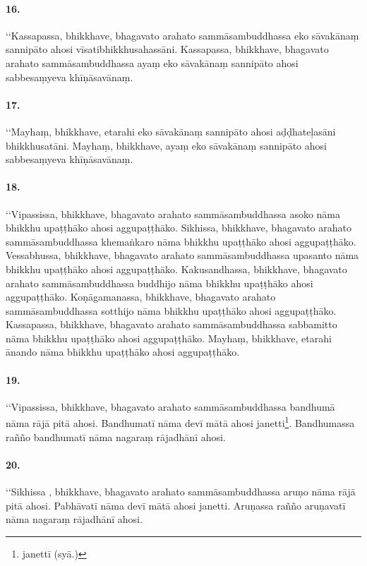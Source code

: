 \paragraph{16.} ‘‘Kassapassa, bhikkhave, bhagavato arahato sammāsambuddhassa eko sāvakānaṃ sannipāto ahosi vīsatibhikkhusahassāni. Kassapassa, bhikkhave, bhagavato arahato sammāsambuddhassa ayaṃ eko sāvakānaṃ sannipāto ahosi sabbesaṃyeva khīṇāsavānaṃ.

\paragraph{17.} ‘‘Mayhaṃ, bhikkhave, etarahi eko sāvakānaṃ sannipāto ahosi aḍḍhateḷasāni bhikkhusatāni. Mayhaṃ, bhikkhave, ayaṃ eko sāvakānaṃ sannipāto ahosi sabbesaṃyeva khīṇāsavānaṃ.

\paragraph{18.} ‘‘Vipassissa, bhikkhave, bhagavato arahato sammāsambuddhassa asoko nāma bhikkhu upaṭṭhāko ahosi aggupaṭṭhāko. Sikhissa, bhikkhave, bhagavato arahato sammāsambuddhassa khemaṅkaro nāma bhikkhu upaṭṭhāko ahosi aggupaṭṭhāko. Vessabhussa, bhikkhave, bhagavato arahato sammāsambuddhassa upasanto nāma bhikkhu upaṭṭhāko ahosi aggupaṭṭhāko. Kakusandhassa, bhikkhave, bhagavato arahato sammāsambuddhassa buddhijo nāma bhikkhu upaṭṭhāko ahosi aggupaṭṭhāko. Koṇāgamanassa, bhikkhave, bhagavato arahato sammāsambuddhassa sotthijo nāma bhikkhu upaṭṭhāko ahosi aggupaṭṭhāko. Kassapassa, bhikkhave, bhagavato arahato sammāsambuddhassa sabbamitto nāma bhikkhu upaṭṭhāko ahosi aggupaṭṭhāko. Mayhaṃ, bhikkhave, etarahi ānando nāma bhikkhu upaṭṭhāko ahosi aggupaṭṭhāko.

\paragraph{19.} ‘‘Vipassissa, bhikkhave, bhagavato arahato sammāsambuddhassa bandhumā nāma rājā pitā ahosi. Bandhumatī nāma devī mātā ahosi janetti\footnote{janettī (syā.)}. Bandhumassa rañño bandhumatī nāma nagaraṃ rājadhānī ahosi.

\paragraph{20.} ‘‘Sikhissa , bhikkhave, bhagavato arahato sammāsambuddhassa aruṇo nāma rājā pitā ahosi. Pabhāvatī nāma devī mātā ahosi janetti. Aruṇassa rañño aruṇavatī nāma nagaraṃ rājadhānī ahosi.

